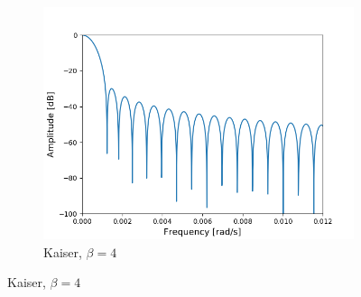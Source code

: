 \begin{figure}[H]
\begin{subfigure}{0.49\textwidth}
\includegraphics[width=\textwidth]{figures/dbplots/stft_bilag/8192/kaiser4.png}
\caption{Kaiser, $\beta=4$}
\end{subfigure}


\end{figure}
